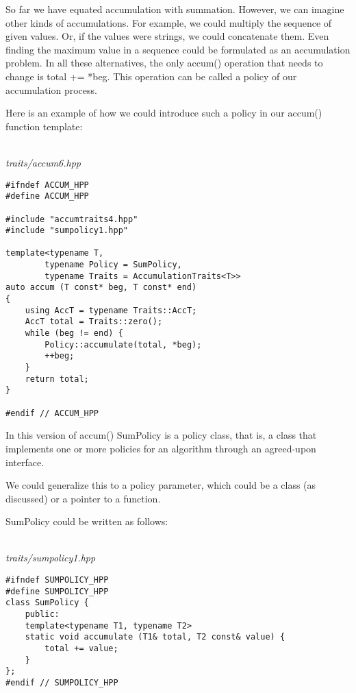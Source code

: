 
So far we have equated accumulation with summation. However, we can imagine other kinds of accumulations. For example, we could multiply the sequence of given values. Or, if the values were strings, we could concatenate them. Even finding the maximum value in a sequence could be formulated as an accumulation problem. In all these alternatives, the only accum() operation that needs to change is total += *beg. This operation can be called a policy of our accumulation process.

Here is an example of how we could introduce such a policy in our accum() function template:

\hspace*{\fill} \\ %
\noindent
\textit{traits/accum6.hpp}
\begin{lstlisting}[style=styleCXX]
#ifndef ACCUM_HPP
#define ACCUM_HPP

#include "accumtraits4.hpp"
#include "sumpolicy1.hpp"

template<typename T,
		typename Policy = SumPolicy,
		typename Traits = AccumulationTraits<T>>
auto accum (T const* beg, T const* end)
{
	using AccT = typename Traits::AccT;
	AccT total = Traits::zero();
	while (beg != end) {
		Policy::accumulate(total, *beg);
		++beg;
	}
	return total;
}

#endif // ACCUM_HPP
\end{lstlisting}

In this version of accum() SumPolicy is a policy class, that is, a class that implements one or more policies for an algorithm through an agreed-upon interface.

\begin{tcolorbox}[colback=webgreen!5!white,colframe=webgreen!75!black]
\hspace*{0.75cm} We could generalize this to a policy parameter, which could be a class (as discussed) or a pointer to a function.
\end{tcolorbox}

SumPolicy could be written as follows:

\hspace*{\fill} \\ %
\noindent
\textit{traits/sumpolicy1.hpp}
\begin{lstlisting}[style=styleCXX]
#ifndef SUMPOLICY_HPP
#define SUMPOLICY_HPP
class SumPolicy {
	public:
	template<typename T1, typename T2>
	static void accumulate (T1& total, T2 const& value) {
		total += value;
	}
};
#endif // SUMPOLICY_HPP
\end{lstlisting}

